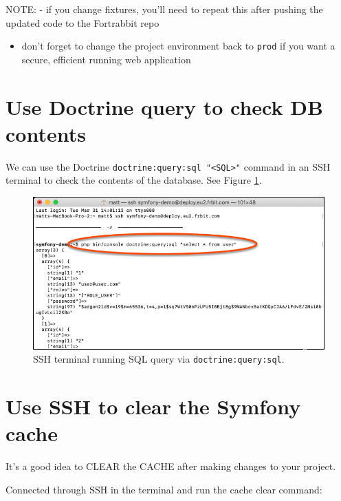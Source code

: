 \documentclass[a4paperpaper,openright]{book}
\providecommand{\tightlist}{%
  \setlength{\itemsep}{0pt}\setlength{\parskip}{0pt}}
\begin{document}
NOTE: - if you change fixtures, you'll need to repeat this after pushing
the updated code to the Fortrabbit repo

\begin{itemize}
\tightlist
\item
  don't forget to change the project environment back to \texttt{prod}
  if you want a secure, efficient running web application
\end{itemize}

\hypertarget{use-doctrine-query-to-check-db-contents}{%
\section{Use Doctrine query to check DB
contents}\label{use-doctrine-query-to-check-db-contents}}

We can use the Doctrine
\texttt{doctrine:query:sql\ "\textless{}SQL\textgreater{}"} command in
an SSH terminal to check the contents of the database. See Figure
\ref{doctrineSQL}.

\begin{figure}
\centering
\includegraphics{./tex2pdf.-5a4428120ede4be1/dfe7b0b301508f2b683938710f230112e1bcfb93.png}
\caption{SSH terminal running SQL query via
\texttt{doctrine:query:sql}.\label{doctrineSQL}}
\end{figure}

\hypertarget{use-ssh-to-clear-the-symfony-cache}{%
\section{Use SSH to clear the Symfony
cache}\label{use-ssh-to-clear-the-symfony-cache}}

It's a good idea to CLEAR the CACHE after making changes to your
project.

Connected through SSH in the terminal and run the cache clear command:
\end{document}

